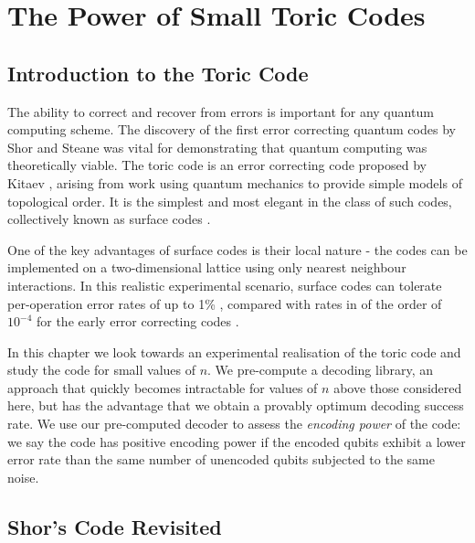 \chapter{The Power of Small Toric Codes} 
\label{ch:SurfaceCodes}

\section{Introduction to the Toric Code}

The ability to correct and recover from errors is important for any quantum computing scheme. The discovery of the first error correcting quantum codes by Shor and Steane \cite{shor_codes_95, steane_code_96, steane_code_96_2} was vital for demonstrating that quantum computing was theoretically viable. The toric code is an error correcting code proposed by Kitaev \cite{kitaev_1, kitaev_2}, arising from work using quantum mechanics to provide simple models of topological order. It is the simplest and most elegant in the class of such codes, collectively known as surface codes \cite{kitaev_bravyi, planar_codes_freedman_meyer}.

One of the key advantages of surface codes is their local nature - the codes can be implemented on a two-dimensional lattice using only nearest neighbour interactions. In this realistic experimental scenario, surface codes can tolerate per-operation error rates of up to 1\% \cite{fowler11, fowler_classical_processing}, compared with rates in of the order of $10^{-4}$ for the early error correcting codes \cite{steane_code_shit}.

In this chapter we look towards an experimental realisation of the toric code and study the code for small values of $n$. We pre-compute a decoding library, an approach that quickly becomes intractable for values of $n$ above those considered here, but has the advantage that we obtain a provably optimum decoding success rate. We use our pre-computed decoder to assess the \textit{encoding power} of the code: we say the code has positive encoding power if the encoded qubits exhibit a lower error rate than the same number of unencoded qubits subjected to the same noise.

\section{Shor's Code Revisited}

